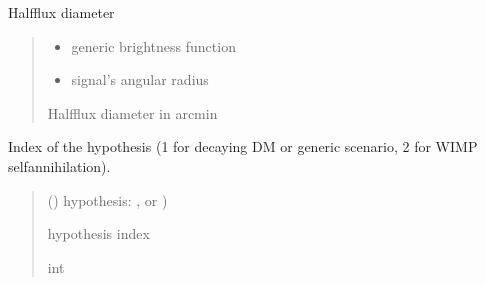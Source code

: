 \documentclass[letterpaper,10pt,english]{sphinxmanual}
\begin{document}

\begin{fulllineitems}
\label{\detokenize{diffsph.utils:diffsph.utils.tools.hfd}}
\pysigstartsignatures
{}
\pysigstopsignatures
\sphinxAtStartPar
Half\sphinxhyphen{}flux diameter
\begin{quote}\begin{description}
\begin{itemize}
\item {} 
\sphinxAtStartPar
{} \textendash{} generic brightness function

\item {} 
\sphinxAtStartPar
{} \textendash{} signal’s angular radius

\end{itemize}

\sphinxAtStartPar
Half\sphinxhyphen{}flux diameter in arcmin

\end{description}\end{quote}

\end{fulllineitems}


\begin{fulllineitems}
\label{\detokenize{diffsph.utils:diffsph.utils.tools.hypothesis_index}}
\pysigstartsignatures
{}
\pysigstopsignatures
\sphinxAtStartPar
Index of the hypothesis (1 for decaying DM or generic scenario, 2 for WIMP self\sphinxhyphen{}annihilation).
\begin{quote}\begin{description}
\sphinxAtStartPar
{} () \textendash{} hypothesis: ,  or )

\sphinxAtStartPar
hypothesis index

\sphinxAtStartPar
int

\end{description}\end{quote}

\end{fulllineitems}
\end{document}
